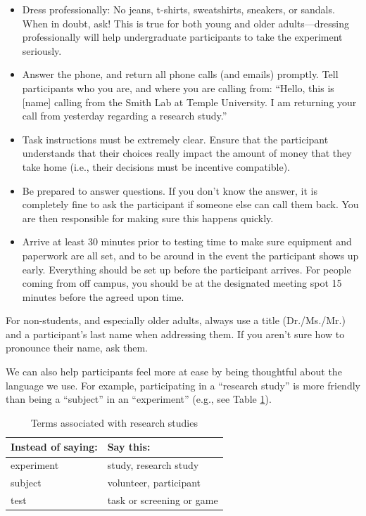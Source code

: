 \documentclass[letterpaper,11pt,oneside]{memoir}
\begin{document}
\begin{itemize}
\item Dress professionally: No jeans, t-shirts, sweatshirts, sneakers, or sandals. When in doubt, ask! This is true for both young and older adults---dressing professionally will help undergraduate participants to take the experiment seriously.
\item Answer the phone, and return all phone calls (and emails) promptly. Tell participants who you are, and where you are calling from: ``Hello, this is [name] calling from the Smith Lab at Temple University. I am returning your call from yesterday regarding a research study.''
\item Task instructions must be extremely clear. Ensure that the participant understands that their choices really impact the amount of money that they take home (i.e., their decisions must be incentive compatible). 
\item Be prepared to answer questions. If you don't know the answer, it is completely fine to ask the participant if someone else can call them back. You are then responsible for making sure this happens quickly.
\item Arrive at least 30 minutes prior to testing time to make sure equipment and paperwork are all set, and to be around in the event the participant shows up early. Everything should be set up before the participant arrives. For people coming from off campus, you should be at the designated meeting spot 15 minutes before the agreed upon time.
\end{itemize}
	
For non-students, and especially older adults, always use a title (Dr./Ms./Mr.) and a participant's last name when addressing them. If you aren't sure how to pronounce their name, ask them.

We can also help participants feel more at ease by being thoughtful about the language we use. For example, participating in a ``research study'' is more friendly than being a ``subject'' in an ``experiment'' (e.g., see Table \ref{table:terms}).

\begin{table}
\centering
\caption{Terms associated with research studies}
\begin{tabular}{ll}
\toprule
Instead of saying: & Say this:\\
\midrule
experiment& study, research study\\
subject& volunteer, participant\\
test & task or screening or game \\
\bottomrule
\end{tabular}
\label{table:terms}
\end{table}
\end{document}
